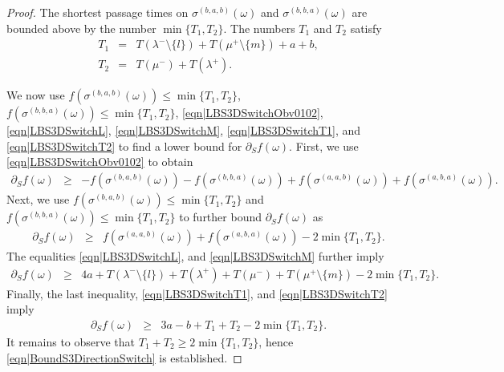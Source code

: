 \documentclass[reqno]{amsart}
\begin{document}
\begin{proof}
The shortest passage times on $\sigma^{(b,a,b)}(\omega)$ and $\sigma^{(b,b,a)}(\omega)$ are bounded above by the number $\min\{T_1,T_2\}$. The numbers $T_1$ and $T_2$ satisfy 
\begin{eqnarray}T_1&=&T(\lambda^-\setminus\{l\})+T(\mu^+\setminus\{m\})+a+b,\label{eqn|LBS3DSwitchT1}\\
T_2&=&T(\mu^-)+T(\lambda^+). 
\label{eqn|LBS3DSwitchT2}
\end{eqnarray}

We now use $f(\sigma^{(b,a,b)}(\omega))\leq \min\{T_1,T_2\}$, $f(\sigma^{(b,b,a)}(\omega))\leq \min\{T_1,T_2\}$, \eqref{eqn|LBS3DSwitchObv0102}, \eqref{eqn|LBS3DSwitchL},  \eqref{eqn|LBS3DSwitchM}, \eqref{eqn|LBS3DSwitchT1}, and \eqref{eqn|LBS3DSwitchT2} to find a lower bound for $\partial_Sf(\omega)$. First, we use \eqref{eqn|LBS3DSwitchObv0102} to obtain 
\begin{eqnarray*}\partial_Sf(\omega)&\geq& -f(\sigma^{(b,a,b)}(\omega))-f(\sigma^{(b,b,a)}(\omega))+
f(\sigma^{(a,a,b)}(\omega))+f(\sigma^{(a,b,a)}(\omega)).\end{eqnarray*}
Next, we use $f(\sigma^{(b,a,b)}(\omega))\leq \min\{T_1,T_2\}$ and $f(\sigma^{(b,b,a)}(\omega))\leq \min\{T_1,T_2\}$ to further bound $\partial_Sf(\omega)$ as 
\begin{eqnarray*}\partial_Sf(\omega)&\geq& 
f(\sigma^{(a,a,b)}(\omega))+f(\sigma^{(a,b,a)}(\omega))-2\min\{T_1,T_2\}.\end{eqnarray*}
The equalities  \eqref{eqn|LBS3DSwitchL}, and \eqref{eqn|LBS3DSwitchM} further imply
\begin{eqnarray*}\partial_Sf(\omega)&\geq&
4a+T(\lambda^-\setminus\{l\})+ T(\lambda^+)+T(\mu^-)+T(\mu^+\setminus\{m\})-2 \min\{T_1,T_2\}.
\end{eqnarray*}
Finally, the last inequality, \eqref{eqn|LBS3DSwitchT1}, and \eqref{eqn|LBS3DSwitchT2} imply
\begin{eqnarray}\partial_Sf(\omega)&\geq & 3a-b +T_1+T_2-2\min\{T_1,T_2\}.\nonumber
\end{eqnarray}
It remains to observe that $T_1+T_2\geq 2\min\{T_1,T_2\}$, hence \eqref{eqn|BoundS3DirectionSwitch} is established.
\end{proof}
 

 
 
 
\end{document}
